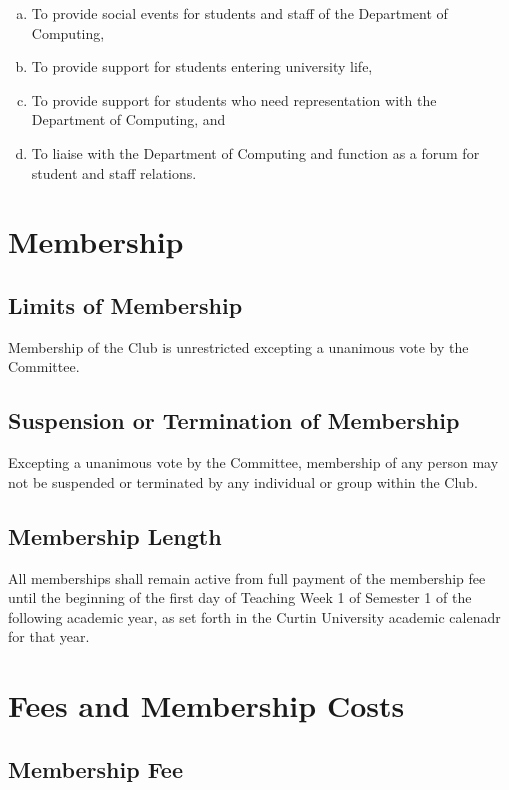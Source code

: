 \documentclass[a4paper,12pt]{article}
\begin{document}
\begin{enumerate}[a)]
	\item To provide social events for students and staff of the Department of Computing,
	\item To provide support for students entering university life,
	\item To provide support for students who need representation with the Department of Computing, and
	\item To liaise with the Department of Computing and function as a forum for student and staff relations.
\end{enumerate}

\section{Membership}

\subsection{Limits of Membership}

Membership of the Club is unrestricted excepting a unanimous vote by the Committee.

\subsection{Suspension or Termination of Membership}

Excepting a unanimous vote by the Committee, membership of any person may not be suspended or terminated by any individual or group within the Club.

\subsection{Membership Length}

All memberships shall remain active from full payment of the membership fee until the beginning of the first day of Teaching Week 1 of Semester 1 of the following academic year, as set forth in the Curtin University academic calenadr for that year.

\section{Fees and Membership Costs}

\subsection{Membership Fee}
\end{document}
